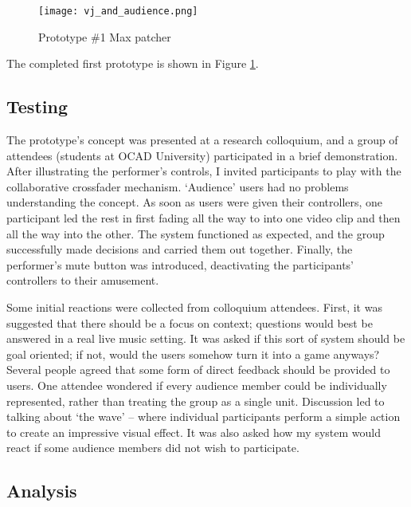 \begin{figure}
	\centering

	\texttt{[image: vj\_and\_audience.png]}
	\caption{Prototype \#1 Max patcher}

	\label{prototyping1.5}
\end{figure}

The completed first prototype is shown in Figure \ref{prototyping1.5}.

\subsection{Testing}

The prototype's concept was presented at a research colloquium, and a group of attendees (students at OCAD University) participated in a brief demonstration. After illustrating the performer's controls, I invited participants to play with the collaborative crossfader mechanism. `Audience' users had no problems understanding the concept. As soon as users were given their controllers, one participant led the rest in first fading all the way to into one video clip and then all the way into the other. The system functioned as expected, and the group successfully made decisions and carried them out together. Finally, the performer's mute button was introduced, deactivating the participants' controllers to their amusement.

Some initial reactions were collected from colloquium attendees. First, it was suggested that there should be a focus on context; questions would best be answered in a real live music setting. It was asked if this sort of system should be goal oriented; if not, would the users somehow turn it into a game anyways? Several people agreed that some form of direct feedback should be provided to users. One attendee wondered if every audience member could be individually represented, rather than treating the group as a single unit. Discussion led to talking about `the wave' -- where individual participants perform a simple action to create an impressive visual effect. It was also asked how my system would react if some audience members did not wish to participate.

\subsection{Analysis}

